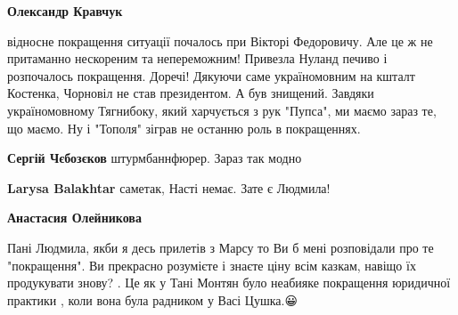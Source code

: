 \begin{itemize}
\begin{itemize}
 
\textbf{Олександр Кравчук} 

відносне покращення ситуації почалось при Вікторі Федоровичу. Але це ж не
притаманно нескореним та непереможним! Привезла Нуланд печиво і розпочалось
покращення. Доречі! Дякуючи саме україномовним на кшталт Костенка, Чорновіл не
став президентом. А був знищений. Завдяки україномовному Тягнибоку, який
харчується з рук "Пупса", ми маємо зараз те, що маємо. Ну і "Тополя" зіграв не
останню роль в покращеннях. \Smiley[1.0][yellow]


 
\textbf{Сергій Чєбозєков} штурмбаннфюрер. Зараз так модно \Smiley[1.0][yellow]

 
\textbf{Larysa Balakhtar} саметак, Насті немає. Зате є Людмила! \Smiley[1.0][yellow]

 
\textbf{Анастасия Олейникова} 

Пані Людмила, якби я десь прилетів з Марсу то Ви б мені розповідали про те
"покращення". Ви прекрасно розумієте і знаєте ціну всім казкам, навіщо їх
продукувати знову? . Це як у Тані Монтян було неабияке покращення юридичної
практики , коли вона була радником у Васі Цушка.😀


 

\end{itemize}
\end{itemize}
